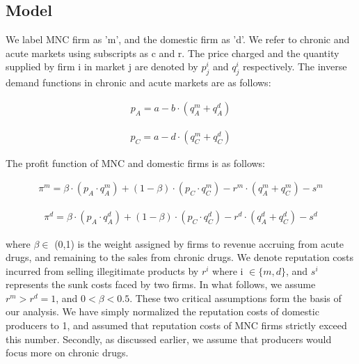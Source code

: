 \documentclass[AER]{AEA}
\theoremstyle{theorem}
\begin{document}
\subsection{Model}

We label MNC firm as 'm', and the domestic firm as 'd'. We refer to chronic and acute markets using subscripts as c and r. The price charged and the quantity supplied by firm i in market j are denoted by $p_{j}^{i}$ and $q_{j}^{i}$ respectively. The inverse demand functions in chronic and acute markets are as follows:

\begin{equation}
	\begin{aligned}
		p_{A} = a- b\cdot (q_{A}^{m} + q_{A}^{d} )
	\end{aligned}
\end{equation}

\begin{equation}
	\begin{aligned}
  p_{C} = a- d\cdot (q_{C}^{m} + q_{C}^{d} )
	\end{aligned}
\end{equation}

The profit function of MNC and domestic firms is as follows:

\begin{equation}
	\begin{aligned}
\pi^{m} = \beta\cdot(p_{A} \cdot q_{A}^{m}) + (1-\beta) \cdot (p_{C} \cdot q_{C}^{m}) - r^{m} \cdot (q^{m}_{A} + q^{m}_{C}) - s^{m}
	\end{aligned}
\end{equation}

\begin{equation}
	\begin{aligned}
\pi^{d} = \beta\cdot(p_{A} \cdot q_{A}^{d}) + (1-\beta) \cdot (p_{C} \cdot q_{C}^{d}) - r^{d} \cdot (q^{d}_{A} + q^{d}_{C}) - s^{d}
	\end{aligned}
\end{equation}


where $\beta \in$ (0,1) is the weight assigned by firms to revenue accruing from acute drugs, and remaining to the sales from chronic drugs. We denote reputation costs incurred from selling illegitimate products by $r^{i}$ where i $\in \{m,d\}$, and $s^{i}$ represents the sunk costs faced by two firms. In what follows, we assume $r^{m} > r^{d} = 1$, and $0 < \beta < 0.5$. These two critical assumptions form the basis of our analysis. We have simply normalized the reputation costs of domestic producers to 1, and assumed that reputation costs of MNC firms strictly exceed this number. Secondly, as discussed earlier, we assume that producers would focus more on chronic drugs. 
\end{document}
